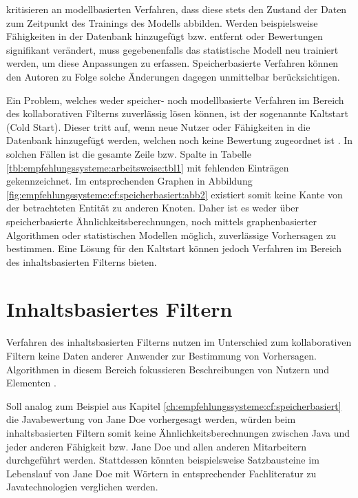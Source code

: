 \textcite[S. 1f.]{pennock:2000} kritisieren an modellbasierten Verfahren, dass diese stets den Zustand der Daten zum Zeitpunkt des Trainings des Modells abbilden. Werden beispielsweise Fähigkeiten in der Datenbank hinzugefügt bzw. entfernt oder Bewertungen signifikant verändert, muss gegebenenfalls das statistische Modell neu trainiert werden, um diese Anpassungen zu erfassen. Speicherbasierte Verfahren können den Autoren zu Folge solche Änderungen dagegen unmittelbar berücksichtigen.

Ein Problem, welches weder speicher- noch modellbasierte Verfahren im Bereich des kollaborativen Filterns zuverlässig lösen können, ist der sogenannte Kaltstart (Cold Start). Dieser tritt auf, wenn neue Nutzer oder Fähigkeiten in die Datenbank hinzugefügt werden, welchen noch keine Bewertung zugeordnet ist \cite[S. 5]{huang:2004}. In solchen Fällen ist die gesamte Zeile bzw. Spalte in Tabelle \ref{tbl:empfehlungssysteme:arbeitsweise:tbl1} mit fehlenden Einträgen gekennzeichnet. Im entsprechenden Graphen in Abbildung \ref{fig:empfehlungssysteme:cf:speicherbasiert:abb2} existiert somit keine Kante von der betrachteten Entität zu anderen Knoten. Daher ist es weder über speicherbasierte Ähnlichkeitsberechnungen, noch mittels graphenbasierter Algorithmen oder statistischen Modellen möglich, zuverlässige Vorhersagen zu bestimmen. Eine Lösung für den Kaltstart können jedoch Verfahren im Bereich des inhaltsbasierten Filterns bieten.

\section{Inhaltsbasiertes Filtern}
\label{ch:empfehlungssysteme:inhaltsbasiertesFiltern}
Verfahren des inhaltsbasierten Filterns nutzen im Unterschied zum kollaborativen Filtern keine Daten anderer Anwender zur Bestimmung von Vorhersagen. Algorithmen in diesem Bereich fokussieren Beschreibungen von Nutzern und Elementen \cite[S. 139f.]{recommenderSystems:2016}.

Soll analog zum Beispiel aus Kapitel \ref{ch:empfehlungssysteme:cf:speicherbasiert} die Javabewertung von Jane Doe vorhergesagt werden, würden beim inhaltsbasierten Filtern somit keine Ähnlichkeitsberechnungen zwischen Java und jeder anderen Fähigkeit bzw. Jane Doe und allen anderen Mitarbeitern durchgeführt werden. Stattdessen könnten beispielsweise Satzbausteine im Lebenslauf von Jane Doe mit Wörtern in entsprechender Fachliteratur zu Javatechnologien verglichen werden.

